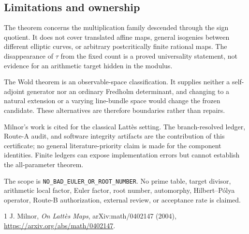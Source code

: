 \documentclass[10pt]{article}
\begin{document}
\subsection*{Limitations and ownership}
The theorem concerns the multiplication family descended through the sign
quotient.  It does not cover translated affine maps, general isogenies between
different elliptic curves, or arbitrary postcritically finite rational maps.
The disappearance of $\tau$ from the fixed count is a proved universality
statement, not evidence for an arithmetic target hidden in the modulus.

The Wold theorem is an observable-space classification.  It supplies neither
a self-adjoint generator nor an ordinary Fredholm determinant, and changing
to a natural extension or a varying line-bundle space would change the frozen
candidate.  These alternatives are therefore boundaries rather than repairs.

Milnor's work is cited for the classical Latt\`es setting.  The branch-resolved
ledger, Route-A audit, and software integrity artifacts are the contribution
of this certificate; no general literature-priority claim is made for the
component identities.  Finite ledgers can expose implementation errors but
cannot establish the all-parameter theorem.

The scope is \texttt{NO\_BAD\_EULER\_OR\_ROOT\_NUMBER}.  No prime table,
target divisor, arithmetic local factor, Euler factor, root number,
automorphy, Hilbert--P\'olya operator, Route-B authorization, external review,
or acceptance rate is claimed.

\begin{thebibliography}{1}
J. Milnor, \emph{On Latt\`es Maps}, arXiv:math/0402147 (2004),
\url{https://arxiv.org/abs/math/0402147}.
\end{thebibliography}
\end{document}
